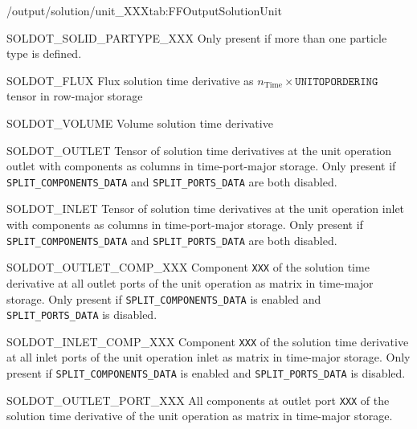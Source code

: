 \begin{groupscope}{/output/solution/unit\_XXX}{tab:FFOutputSolutionUnit}
\begin{dataset}[type=double,unit={\si{\mol\per\cubic\metre\of{SP}\per\second}}]{SOLDOT\_SOLID\_PARTYPE\_XXX}
    Only present if more than one particle type is defined.
  \end{dataset}
  \begin{dataset}[type=double,unit={\si{\mol\per\square\metre\per\square\second}}]{SOLDOT\_FLUX}
    Flux solution time derivative as $n_{\text{Time}} \times \texttt{UNITOPORDERING}$ tensor in row-major storage
  \end{dataset}
  \begin{dataset}[type=double,unit={\si{\cubic\metre\per\second}}]{SOLDOT\_VOLUME}
    Volume solution time derivative 
  \end{dataset}
  \begin{dataset}[type=double,unit={\si{\mol\per\cubic\metre\of{IV}\per\second}}]{SOLDOT\_OUTLET}
    Tensor of solution time derivatives at the unit operation outlet with components as columns in time-port-major storage.
    Only present if \texttt{SPLIT\_COMPONENTS\_DATA} and \texttt{SPLIT\_PORTS\_DATA} are both disabled.
  \end{dataset}
  \begin{dataset}[type=double,unit={\si{\mol\per\cubic\metre\of{IV}\per\second}}]{SOLDOT\_INLET}
    Tensor of solution time derivatives at the unit operation inlet with components as columns in time-port-major storage.
    Only present if \texttt{SPLIT\_COMPONENTS\_DATA} and \texttt{SPLIT\_PORTS\_DATA} are both disabled.
  \end{dataset}
  \begin{dataset}[type=double,unit={\si{\mol\per\cubic\metre\of{IV}\per\second}}]{SOLDOT\_OUTLET\_COMP\_XXX}
    Component \texttt{XXX} of the solution time derivative at all outlet ports of the unit operation as matrix in time-major storage.
    Only present if \texttt{SPLIT\_COMPONENTS\_DATA} is enabled and \texttt{SPLIT\_PORTS\_DATA} is disabled.
  \end{dataset}
  \begin{dataset}[type=double,unit={\si{\mol\per\cubic\metre\of{IV}\per\second}}]{SOLDOT\_INLET\_COMP\_XXX}
    Component \texttt{XXX} of the solution time derivative at all inlet ports of the unit operation inlet as matrix in time-major storage.
    Only present if \texttt{SPLIT\_COMPONENTS\_DATA} is enabled and \texttt{SPLIT\_PORTS\_DATA} is disabled.
  \end{dataset}
  \begin{dataset}[type=double,unit={\si{\mol\per\cubic\metre\of{IV}\per\second}}]{SOLDOT\_OUTLET\_PORT\_XXX}
    All components at outlet port \texttt{XXX} of the solution time derivative of the unit operation as matrix in time-major storage.

\end{dataset}
\end{groupscope}
